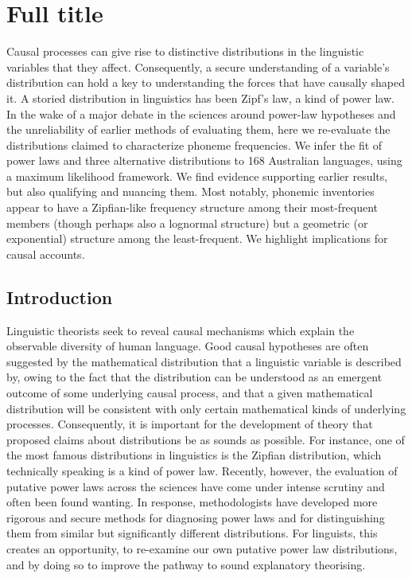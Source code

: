 \chapter[Abbreviated title]{Full title}
\label{Chap:label}	%
\pagestyle{headings}

Causal processes can give rise to distinctive distributions in the linguistic variables that they affect. Consequently, a secure understanding of a variable's distribution can hold a key to understanding the forces that have causally shaped it. A storied distribution in linguistics has been Zipf's law, a kind of power law. In the wake of a major debate in the sciences around power-law hypotheses and the unreliability of earlier methods of evaluating them, here we re-evaluate the distributions claimed to characterize phoneme frequencies. We infer the fit of power laws and three alternative distributions to 168 Australian languages, using a maximum likelihood framework. We find evidence supporting earlier results, but also qualifying and nuancing them. Most notably, phonemic inventories appear to have a Zipfian-like frequency structure among their most-frequent members (though perhaps also a lognormal structure) but a geometric (or exponential) structure among the least-frequent. We highlight implications for causal accounts.



\section{Introduction}
\label{Sec:label}	%


Linguistic theorists seek to reveal causal mechanisms which explain the observable diversity of human language. Good causal hypotheses are often suggested by the mathematical distribution that a linguistic variable is described by, owing to the fact that the distribution can be understood as an emergent outcome of some underlying causal process, and that a given mathematical distribution will be consistent with only certain mathematical kinds of underlying processes. Consequently, it is important for the development of theory that proposed claims about distributions be as sounds as possible. For instance, one of the most famous distributions in linguistics is the Zipfian distribution, which technically speaking is a kind of power law. Recently, however, the evaluation of putative power laws across the sciences have come under intense scrutiny and often been found wanting. In response, methodologists have developed more rigorous and secure methods for diagnosing power laws and for distinguishing them from similar but significantly different distributions. For linguists, this creates an opportunity, to re-examine our own putative power law distributions, and by doing so to improve the pathway to sound explanatory theorising.

